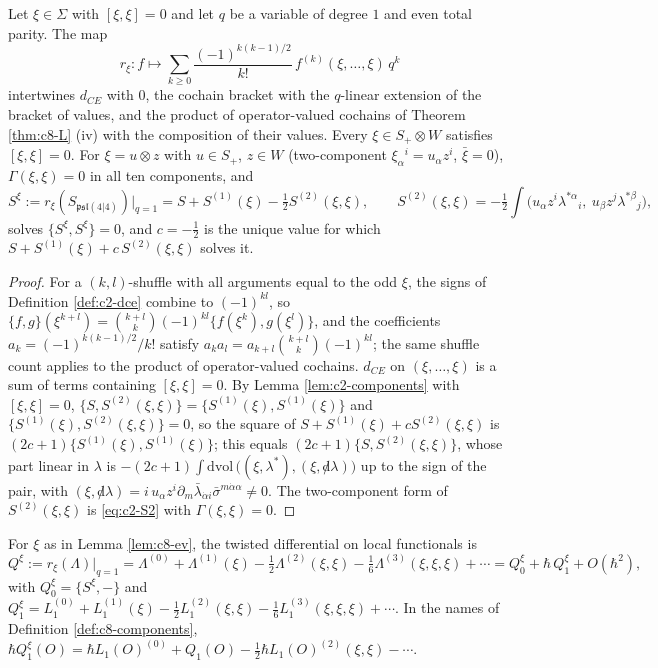 \begin{lemma}
\label{lem:c8-ev}
Let $\xi\in\Sigma$ with $[\xi,\xi]=0$ and let $q$ be a variable of degree $1$ and even total parity. The map
\[
r_\xi\colon f\mapsto\sum_{k\ge0}\frac{(-1)^{k(k-1)/2}}{k!}\,f^{(k)}(\xi,\dots,\xi)\,q^k
\]
intertwines $d_{CE}$ with $0$, the cochain bracket with the $q$-linear extension of the bracket of values, and the product of operator-valued cochains of Theorem \ref{thm:c8-L} (iv) with the composition of their values. Every $\xi\in S_+\otimes W$ satisfies $[\xi,\xi]=0$. For $\xi=u\otimes z$ with $u\in S_+$, $z\in W$ (two-component $\xi_\alpha{}^i=u_\alpha z^i$, $\bar\xi=0$), $\Gamma(\xi,\xi)=0$ in all ten components, and
\begin{equation}
S^\xi:=r_\xi(S_{\mathfrak{psl}(4|4)})\big|_{q=1}=S+S^{(1)}(\xi)-\tfrac12S^{(2)}(\xi,\xi),\qquad S^{(2)}(\xi,\xi)=-\tfrac12\int\big(u_\alpha z^i\lambda^{*\alpha}{}_i,\ u_\beta z^j\lambda^{*\beta}{}_j\big),
\label{eq:c8-twistaction}
\end{equation}
solves $\{S^\xi,S^\xi\}=0$, and $c=-\tfrac12$ is the unique value for which $S+S^{(1)}(\xi)+c\,S^{(2)}(\xi,\xi)$ solves it.
\end{lemma}

\begin{proof}
For a $(k,l)$-shuffle with all arguments equal to the odd $\xi$, the signs of Definition \ref{def:c2-dce} combine to $(-1)^{kl}$, so $\{f,g\}(\xi^{k+l})=\binom{k+l}{k}(-1)^{kl}\{f(\xi^k),g(\xi^l)\}$, and the coefficients $a_k=(-1)^{k(k-1)/2}/k!$ satisfy $a_ka_l=a_{k+l}\binom{k+l}{k}(-1)^{kl}$; the same shuffle count applies to the product of operator-valued cochains. $d_{CE}$ on $(\xi,\dots,\xi)$ is a sum of terms containing $[\xi,\xi]=0$. By Lemma \ref{lem:c2-components} with $[\xi,\xi]=0$, $\{S,S^{(2)}(\xi,\xi)\}=\{S^{(1)}(\xi),S^{(1)}(\xi)\}$ and $\{S^{(1)}(\xi),S^{(2)}(\xi,\xi)\}=0$, so the square of $S+S^{(1)}(\xi)+cS^{(2)}(\xi,\xi)$ is $(2c+1)\{S^{(1)}(\xi),S^{(1)}(\xi)\}$; this equals $(2c+1)\{S,S^{(2)}(\xi,\xi)\}$, whose part linear in $\lambda$ is $-(2c+1)\int\mathrm{dvol}\,\big((\xi,\lambda^*),(\xi,{\not d}\lambda)\big)$ up to the sign of the pair, with $(\xi,{\not d}\lambda)=i\,u_\alpha z^i\partial_m\bar\lambda_{\dot\alpha i}\bar\sigma^{m\dot\alpha\alpha}\neq0$. The two-component form of $S^{(2)}(\xi,\xi)$ is \eqref{eq:c2-S2} with $\Gamma(\xi,\xi)=0$.
\end{proof}

\begin{definition}
\label{def:c8-twisted}
For $\xi$ as in Lemma \ref{lem:c8-ev}, the twisted differential on local functionals is
\[
Q^\xi:=r_\xi(\Lambda)\big|_{q=1}=\Lambda^{(0)}+\Lambda^{(1)}(\xi)-\tfrac12\Lambda^{(2)}(\xi,\xi)-\tfrac16\Lambda^{(3)}(\xi,\xi,\xi)+\cdots=Q^\xi_0+\hbar\,Q^\xi_1+O(\hbar^2),
\]
with $Q^\xi_0=\{S^\xi,-\}$ and $Q^\xi_1=L_1^{(0)}+L_1^{(1)}(\xi)-\tfrac12L_1^{(2)}(\xi,\xi)-\tfrac16L_1^{(3)}(\xi,\xi,\xi)+\cdots$. In the names of Definition \ref{def:c8-components}, $\hbar Q^\xi_1(O)=\hbar L_1(O)^{(0)}+Q_1(O)-\tfrac12\hbar L_1(O)^{(2)}(\xi,\xi)-\cdots$.
\end{definition}

